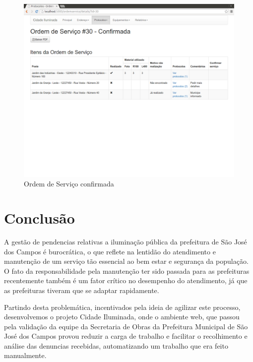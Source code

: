 \documentclass[
	article,			%
	11pt,				%
	oneside,			%
	a4paper,			%
	english,			%
	brazil,				%
	sumario=tradicional
	]{abntex2}
\begin{document}
\begin{figure}[!htbp]
 \centering
 \caption{\label{site-os-confirmada}Ordem de Serviço confirmada}
 \includegraphics[scale=0.25]{site/20-os_confirmada.png}
\end{figure}

\clearpage

%

\section*{Conclusão}

A gestão de pendencias relativas a iluminação pública da prefeitura de São José dos Campos é burocrática, o que reflete na lentidão do atendimento e manutenção de um serviço tão essencial ao bem estar e segurança da população.
O fato da responsabilidade pela manutenção ter sido passada para as prefeituras recentemente também é um fator crítico no desempenho do atendimento, já que as prefeituras tiveram que se adaptar rapidamente.

Partindo desta problemática, incentivados pela ideia de agilizar este processo, desenvolvemos o projeto Cidade Iluminada, onde o ambiente web, que passou pela validação da equipe da Secretaria de Obras da Prefeitura Municipal de São José dos Campos provou reduzir a carga de trabalho e facilitar o recolhimento e análise das denuncias recebidas, automatizando um trabalho que era feito manualmente.
\end{document}
